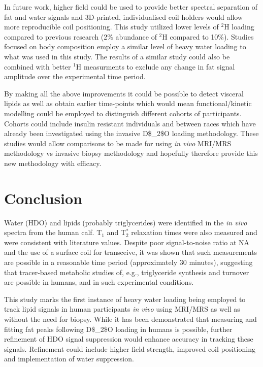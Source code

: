 In future work, higher field could be used to provide better spectral separation of fat and water signals and 3D-printed, individualised coil holders would allow more reproducible coil positioning. This study utilized lower levels of $^2$H loading compared to previous research (2\% abundance of $^2$H compared to 10\%). Studies focused on body composition employ a similar level of heavy water loading to what was used in this study. The results of a similar study could also be combined with better $^1$H measurments to exclude any change in fat signal amplitude over the experimental time period. 

By making all the above improvements it could be possible to detect visceral lipids as well as obtain earlier time-points which would mean functional/kinetic modelling could be employed to distinguish different cohorts of participants. Cohorts could include insulin resistant individuals \cite{White2017AssociationHumans} and between races \cite{White2018RacialHumans} which have already been investigated using the invasive \ac{D$_2$O} loading methodology. These studies would allow comparisons to be made for using \textit{in vivo} \ac{MRI}/\ac{MRS} methodology vs invasive biopsy methodology and hopefully therefore provide this new methodology with efficacy.

\section{Conclusion}

Water (\ac{HDO}) and lipids (probably triglycerides) were identified in the \textit{in vivo} spectra from the human calf. T$_1$ and T$_2^*$ relaxation times were also measured and were consistent with literature values. Despite poor signal-to-noise ratio at \ac{NA} and the use of a surface coil for transceive, it was shown that such measurements are possible in a reasonable time period (approximately 30 minutes), suggesting that tracer-based metabolic studies of, e.g., triglyceride synthesis and turnover are possible in humans, and in such experimental conditions.  

This study marks the first instance of heavy water loading being employed to track lipid signals in human participants \textit{in vivo} using \ac{MRI}/\ac{MRS} as well as without the need for biopsy. While it has been demonstrated that measuring and fitting fat peaks following \ac{D$_2$O} loading in humans is possible, further refinement of \ac{HDO} signal suppression would enhance accuracy in tracking these signals. Refinement could include higher field strength, improved coil positioning and implementation of water suppression. 


% 
